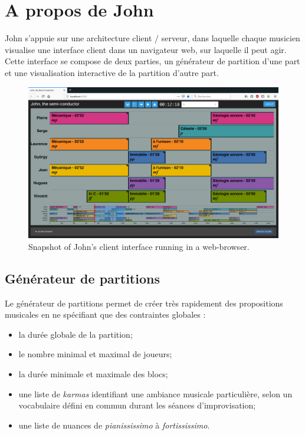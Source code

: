 \section{A propos de John}

\noindent John s'appuie sur une architecture client / serveur, dans laquelle chaque musicien visualise une interface client dans un navigateur web, sur laquelle il peut agir. Cette interface se compose de deux parties, un générateur de partition d'une part et une visualisation interactive de la partition d'autre part.
\begin{figure}[!htbp]
	\includegraphics[width=\textwidth]{gfx/notation/John-snapshot.png}
	\caption{Snapshot of John's client interface running in a web-browser.}
	\label{fig:notation:john-snapshot}
\end{figure}

\subsection{Générateur de partitions}

\noindent Le générateur de partitions permet de créer très rapidement des propositions musicales en ne spécifiant que des contraintes globales :
\begin{itemize}[noitemsep]
\item la durée globale de la partition;
\item le nombre minimal et maximal de joueurs;
\item la durée minimale et maximale des blocs;
\item une liste de \textit{karmas} identifiant une ambiance musicale particulière, selon un vocabulaire défini en commun durant les séances d'improvisation;
\item une liste de nuances de \textit{pianississimo} à \textit{fortississimo}.
\end{itemize}

